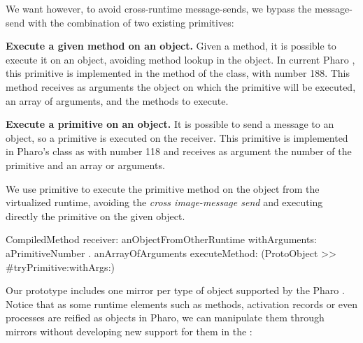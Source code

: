 We want however, to avoid cross-runtime message-sends, we bypass the message-send with the combination of two existing primitives:
\begin{description}
	\item \textbf{Execute a given method on an object.} Given a method, it is possible to execute it on an object, avoiding method lookup in the object. In current Pharo \VM, this primitive is implemented in the method \textbf{} of the  class, with number 188. This method receives as arguments the object on which the primitive will be executed, an array of arguments, and the methods to execute.
	\item \textbf{Execute a primitive on an object.} It is possible to send a message to an object, so a primitive is executed on the receiver. This primitive is implemented in Pharo's  class as \textbf{} with number 118 and receives as argument the number of the primitive and an array or arguments.
\end{description}

We use primitive  to execute the primitive method  on the object from the virtualized runtime, avoiding the \emph{cross image-message send} and executing directly the primitive on the given object.

\begin{code}
CompiledMethod
       receiver: anObjectFromOtherRuntime
       withArguments: { aPrimitiveNumber . anArrayOfArguments }
       executeMethod: (ProtoObject >> #tryPrimitive:withArgs:)
\end{code}

Our \Vtt prototype includes one mirror per type of object supported by the Pharo \VM. Notice that as some runtime elements such as methods, activation records or even processes are reified as objects in Pharo, we can manipulate them through mirrors without developing new support for them in the \VM:

